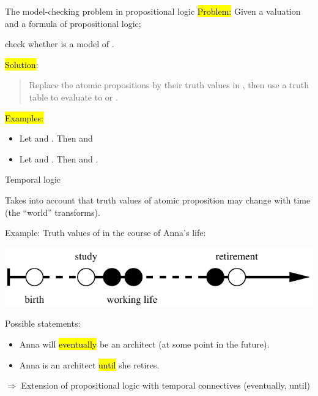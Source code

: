 \begin{frame}{The model-checking problem in propositional logic}
\hl{Problem:} Given a valuation 
   and a formula  of propositional logic;

\begin{center}
check whether  is a model of .
\end{center}   


\hl{Solution}:
\begin{quote}
Replace the atomic propositions by their truth values in ,
then use a truth table to evaluate to  or .
\end{quote}

\bigskip
\hl{Examples:} 
\begin{itemize}
  \item Let  and .
  Then  and 

  \item Let  and . 
  Then  and .
\end{itemize}

\end{frame}


\begin{frame}{Temporal logic}

Takes into account that truth values of atomic proposition may
change with time (the ``world'' transforms).

\bigskip
Example: Truth values of  in the course of Anna's life:

\begin{center}
\includegraphics[width=\textwidth]{content/chapter_model_checking/model_checking/images/anna}
\end{center}

Possible statements:
\begin{itemize}
\item Anna will \hl{eventually} be an architect (at some point in the future).
\item Anna is an architect \hl{until} she retires.
\end{itemize}
$\Longrightarrow$ Extension of propositional logic with
    temporal connectives (eventually, until)
\end{frame}

